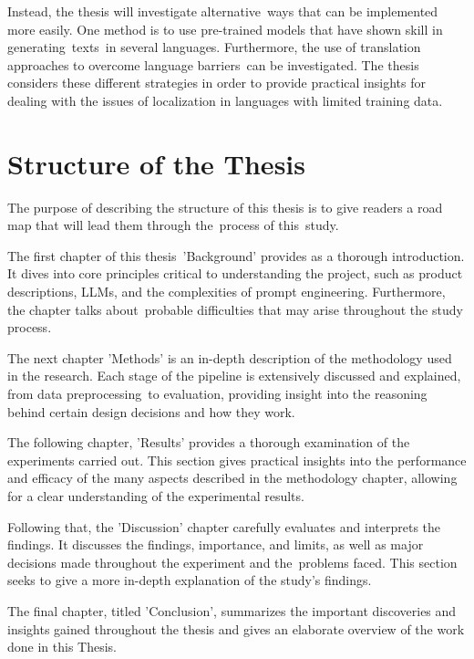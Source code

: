 \begin{enumerate}
    Instead, the thesis will investigate alternative ways that can be implemented more easily. One method is to use pre-trained models that have shown skill in generating texts in several languages. Furthermore, the use of translation approaches to overcome language barriers can be investigated. The thesis considers these different strategies in order to provide practical insights for dealing with the issues of localization in languages with limited training data.


\end{enumerate}

\section{Structure of the Thesis}

The purpose of describing the structure of this thesis is to give readers a road map that will lead them through the process of this study.

The first chapter of this thesis 'Background' provides as a thorough introduction. It dives into core principles critical to understanding the project, such as product descriptions, LLMs, and the complexities of prompt engineering. Furthermore, the chapter talks about probable difficulties that may arise throughout the study process.

The next chapter 'Methods' is an in-depth description of the methodology used in the research. Each stage of the pipeline is extensively discussed and explained, from data preprocessing to evaluation, providing insight into the reasoning behind certain design decisions and how they work.

The following chapter, 'Results' provides a thorough examination of the experiments carried out. This section gives practical insights into the performance and efficacy of the many aspects described in the methodology chapter, allowing for a clear understanding of the experimental results.

Following that, the 'Discussion' chapter carefully evaluates and interprets the findings. It discusses the findings, importance, and limits, as well as major decisions made throughout the experiment and the problems faced. This section seeks to give a more in-depth explanation of the study's findings.

The final chapter, titled 'Conclusion', summarizes the important discoveries and insights gained throughout the thesis and gives an elaborate overview of the work done in this Thesis. 


